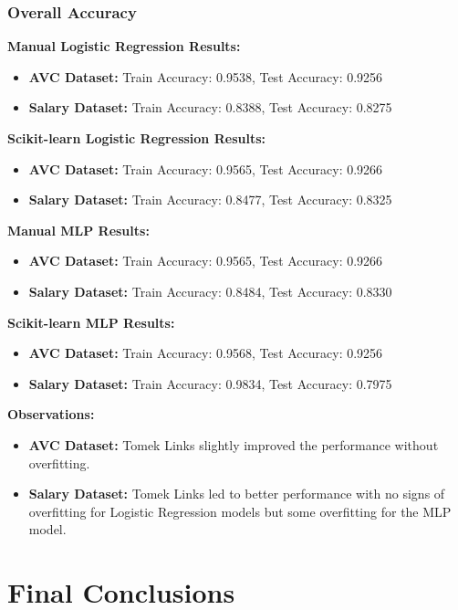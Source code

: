 \documentclass[a4paper,12pt]{article}
\begin{document}
\subsubsection{Overall Accuracy}

\textbf{Manual Logistic Regression Results:}
\begin{itemize}
    \item \textbf{AVC Dataset:} Train Accuracy: 0.9538, Test Accuracy: 0.9256
    \item \textbf{Salary Dataset:} Train Accuracy: 0.8388, Test Accuracy: 0.8275
\end{itemize}

\textbf{Scikit-learn Logistic Regression Results:}
\begin{itemize}
    \item \textbf{AVC Dataset:} Train Accuracy: 0.9565, Test Accuracy: 0.9266
    \item \textbf{Salary Dataset:} Train Accuracy: 0.8477, Test Accuracy: 0.8325
\end{itemize}

\textbf{Manual MLP Results:}
\begin{itemize}
    \item \textbf{AVC Dataset:} Train Accuracy: 0.9565, Test Accuracy: 0.9266
    \item \textbf{Salary Dataset:} Train Accuracy: 0.8484, Test Accuracy: 0.8330
\end{itemize}

\textbf{Scikit-learn MLP Results:}
\begin{itemize}
    \item \textbf{AVC Dataset:} Train Accuracy: 0.9568, Test Accuracy: 0.9256
    \item \textbf{Salary Dataset:} Train Accuracy: 0.9834, Test Accuracy: 0.7975
\end{itemize}

\textbf{Observations:}
\begin{itemize}
    \item \textbf{AVC Dataset:} Tomek Links slightly improved the performance without overfitting.
    \item \textbf{Salary Dataset:} Tomek Links led to better performance with no signs of overfitting for Logistic Regression models but some overfitting for the MLP model.
\end{itemize}

\newpage

\section{Final Conclusions}
\end{document}
